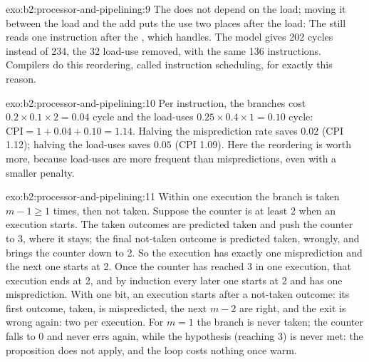 \begin{solution}{exo:b2:processor-and-pipelining:9}
The  does not depend on the load; moving it between the load and the add puts the use two
places after the load:
The  still reads  one instruction after the , which  handles. The model gives
202 cycles instead of 234, the 32 load-use  removed, with the same 136 instructions. Compilers do this
reordering, called instruction scheduling, for exactly this reason.
\end{solution}

\begin{solution}{exo:b2:processor-and-pipelining:10}
Per instruction, the branches cost $0.2 \times 0.1 \times 2 = 0.04$ cycle and the load-uses $0.25 \times 0.4 \times 1
= 0.10$ cycle: $\text{CPI} = 1 + 0.04 + 0.10 = 1.14$. Halving the misprediction rate saves $0.02$ (CPI 1.12); halving
the load-uses saves $0.05$ (CPI 1.09). Here the reordering is worth more, because load-uses are more frequent than
mispredictions, even with a smaller penalty.
\end{solution}

\begin{solution}{exo:b2:processor-and-pipelining:11}
Within one execution the branch is taken $m - 1 \ge 1$ times, then not taken. Suppose the counter is at least 2 when
an execution starts. The taken outcomes are predicted taken and push the counter to 3, where it stays; the final
not-taken outcome is predicted taken, wrongly, and brings the counter down to 2. So the execution has exactly one
misprediction and the next one starts at 2. Once the counter has reached 3 in one execution, that execution ends at
2, and by induction every later one starts at 2 and has one misprediction. With one bit, an execution starts after a
not-taken outcome: its first outcome, taken, is mispredicted, the next $m - 2$ are right, and the exit is wrong
again: two per execution. For $m = 1$ the branch is never taken; the counter falls to 0 and never errs again, while
the hypothesis (reaching 3) is never met: the proposition does not apply, and the loop costs nothing once warm.
\end{solution}

